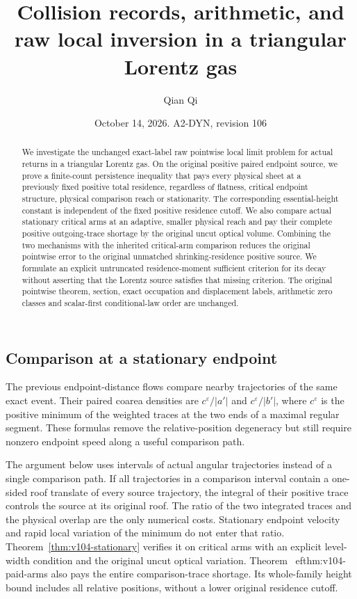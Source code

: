 \documentclass[11pt,reqno]{amsart}
\title[Collision records and raw local inversion]{Collision records, arithmetic, and raw local inversion in a triangular Lorentz gas}
\author{Qian Qi}
\date{October 14, 2026. A2-DYN, revision 106}
\numberwithin{equation}{section}
\theoremstyle{definition}\newtheorem{definition}[theorem]{Definition}
\theoremstyle{remark}\newtheorem{remark}[theorem]{Remark}
\begin{document}
\raggedbottom
\begin{abstract}
We investigate the unchanged exact-label raw pointwise local limit
problem for actual returns in a triangular Lorentz gas. On the
original positive paired endpoint source, we prove a finite-count
persistence inequality that pays every physical sheet at a previously
fixed positive total residence, regardless of flatness, critical
endpoint structure, physical comparison reach or stationarity.
The corresponding essential-height constant is independent of the
fixed positive residence cutoff. We also compare actual stationary
critical arms at an adaptive, smaller physical reach and pay their
complete positive outgoing-trace shortage by the original uncut
optical volume. Combining the two mechanisms with the inherited
critical-arm comparison reduces the original pointwise error
to the original unmatched shrinking-residence positive source.
We formulate an explicit untruncated residence-moment sufficient
criterion for its decay without asserting that the Lorentz source
satisfies that missing criterion. The original pointwise theorem,
section, exact occupation and displacement labels, arithmetic
zero classes and scalar-first conditional-law order are unchanged.
\end{abstract}
\maketitle


\subsection{Comparison at a stationary endpoint}
The previous endpoint-distance flows compare nearby trajectories of
the same exact event. Their paired coarea densities are
$c^\varepsilon/|a'|$ and $c^\varepsilon/|b'|$, where
$c^\varepsilon$ is the positive minimum of the weighted traces at
the two ends of a maximal regular segment. These formulas remove
the relative-position degeneracy but still require nonzero endpoint
speed along a useful comparison path.

The argument below uses intervals of actual angular trajectories
instead of a single comparison path. If all trajectories in a
comparison interval contain a one-sided roof translate of every
source trajectory, the integral of their positive trace controls the
source at its original roof. The ratio of the two integrated traces
and the physical overlap are the only numerical costs. Stationary
endpoint velocity and rapid local variation of the minimum do not
enter that ratio. Theorem~\ref{thm:v104-stationary} verifies it on
critical arms with an explicit level-width condition and the original uncut optical variation. Theorem~
ef{thm:v104-paid-arms}
also pays the entire comparison-trace shortage. Its whole-family
height bound includes all
relative positions, without a lower original residence cutoff.
\end{document}
